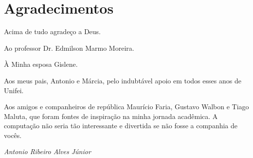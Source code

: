 \chapter*{Agradecimentos}

Acima de tudo agradeço a Deus.

Ao professor Dr. Edmilson Marmo Moreira.

À Minha esposa Gislene.

Aos meus pais, Antonio e Márcia, pelo indubtável apoio em todos esses anos de Unifei.

Aos amigos e companheiros de república Maurício Faria, Gustavo Walbon e Tiago Maluta, que foram fontes de inspiração na minha jornada acadêmica. A computação não seria tão interessante e divertida se não fosse a companhia de vocês.

\textit{Antonio Ribeiro Alves Júnior}

